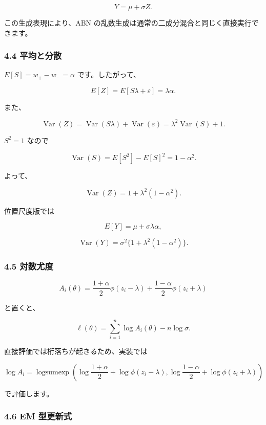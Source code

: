\documentclass[
]{article}
\begin{document}
\[
Y=\mu+\sigma Z.
\]

この生成表現により、ABN
の乱数生成は通常の二成分混合と同じく直接実行できます。

\hypertarget{ux5e73ux5747ux3068ux5206ux6563}{%
\subsubsection{4.4 平均と分散}\label{ux5e73ux5747ux3068ux5206ux6563}}

\(E[S]=w_+-w_- = \alpha\) です。したがって、

\[
E[Z]=E[S\lambda+\varepsilon]=\lambda\alpha.
\]

また、

\[
\operatorname{Var}(Z)
=\operatorname{Var}(S\lambda)+\operatorname{Var}(\varepsilon)
=\lambda^2\operatorname{Var}(S)+1.
\]

\(S^2=1\) なので

\[
\operatorname{Var}(S)=E[S^2]-E[S]^2=1-\alpha^2.
\]

よって、

\[
\operatorname{Var}(Z)=1+\lambda^2(1-\alpha^2).
\]

位置尺度版では

\[
E[Y]=\mu+\sigma\lambda\alpha,
\]

\[
\operatorname{Var}(Y)=\sigma^2\{1+\lambda^2(1-\alpha^2)\}.
\]

\hypertarget{ux5bfeux6570ux5c24ux5ea6-1}{%
\subsubsection{4.5 対数尤度}\label{ux5bfeux6570ux5c24ux5ea6-1}}

\[
A_i(\theta)
=\frac{1+\alpha}{2}\phi(z_i-\lambda)
+\frac{1-\alpha}{2}\phi(z_i+\lambda)
\]

と置くと、

\[
\ell(\theta)=\sum_{i=1}^{n}\log A_i(\theta)-n\log\sigma.
\]

直接評価では桁落ちが起きるため、実装では

\[
\log A_i
=\operatorname{logsumexp}\left(
\log\frac{1+\alpha}{2}+\log\phi(z_i-\lambda),
\log\frac{1-\alpha}{2}+\log\phi(z_i+\lambda)
\right)
\]

で評価します。

\hypertarget{em-ux578bux66f4ux65b0ux5f0f}{%
\subsubsection{4.6 EM 型更新式}\label{em-ux578bux66f4ux65b0ux5f0f}}
\end{document}
